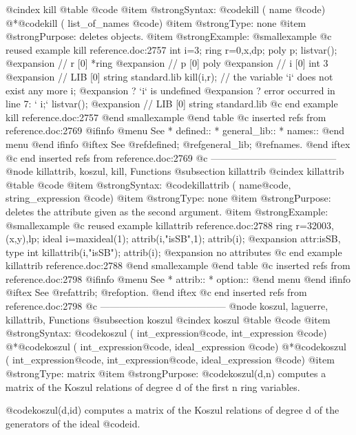 {@cindex kill
@table @code
@item @strong{Syntax:}
@code{kill (} name @code{)}
@*@code{kill (} list_of_names @code{)}
@item @strong{Type:}
none
@item @strong{Purpose:}
deletes objects.
@item @strong{Example:}
@smallexample
@c reused example kill reference.doc:2757 
  int i=3;
  ring r=0,x,dp;
  poly p;
  listvar();
@expansion{} // r                    [0]  *ring
@expansion{} //      p                    [0]  poly
@expansion{} // i                    [0]  int 3
@expansion{} // LIB                  [0]  string standard.lib
  kill(i,r);
  // the variable `i` does not exist any more
  i;
@expansion{}    ? `i` is undefined
@expansion{}    ? error occurred in line 7: `  i;`
  listvar();
@expansion{} // LIB                  [0]  string standard.lib
@c end example kill reference.doc:2757
@end smallexample
@end table
@c inserted refs from reference.doc:2769
@ifinfo
@menu
See
* defined::
* general_lib::
* names::
@end menu
@end ifinfo
@iftex
See
@ref{defined};
@ref{general_lib};
@ref{names}.
@end iftex
@c end inserted refs from reference.doc:2769
@c ---------------------------------------
@node killattrib, koszul, kill, Functions
@subsection killattrib
@cindex killattrib
@table @code
@item @strong{Syntax:}
@code{killattrib (} name@code{,} string_expression @code{)}
@item @strong{Type:}
none
@item @strong{Purpose:}
deletes the attribute given as the second argument.
@item @strong{Example:}
@smallexample
@c reused example killattrib reference.doc:2788 
  ring r=32003,(x,y),lp;
  ideal i=maxideal(1);
  attrib(i,"isSB",1);
  attrib(i);
@expansion{} attr:isSB, type int
  killattrib(i,"isSB");
  attrib(i);
@expansion{} no attributes
@c end example killattrib reference.doc:2788
@end smallexample
@end table
@c inserted refs from reference.doc:2798
@ifinfo
@menu
See
* attrib::
* option::
@end menu
@end ifinfo
@iftex
See
@ref{attrib};
@ref{option}.
@end iftex
@c end inserted refs from reference.doc:2798
@c ---------------------------------------
@node koszul, laguerre, killattrib, Functions
@subsection koszul
@cindex koszul
@table @code
@item @strong{Syntax:}
@code{koszul (} int_expression@code{,} int_expression @code{)}
@*@code{koszul (} int_expression@code{,} ideal_expression @code{)}
@*@code{koszul (} int_expression@code{,} int_expression@code{,} ideal_expression @code{)}
@item @strong{Type:}
matrix
@item @strong{Purpose:}
@code{koszul(d,n)} computes a matrix of the Koszul relations of degree d of
the first n ring variables.

@code{koszul(d,id)} computes a matrix of the Koszul relations of degree d of
the generators of the ideal @code{id}.

}
